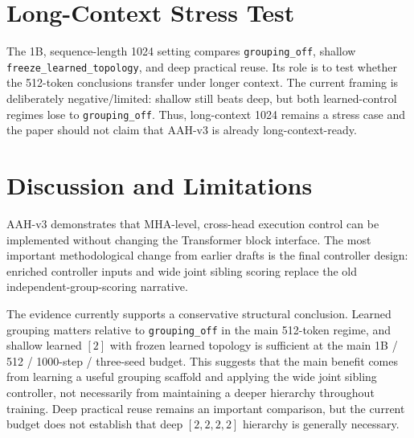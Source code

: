 \documentclass[11pt]{article}
\begin{document}
\section{Long-Context Stress Test}

The 1B, sequence-length 1024 setting compares \texttt{grouping\_off}, shallow \texttt{freeze\_learned\_topology}, and deep practical reuse. Its role is to test whether the 512-token conclusions transfer under longer context. The current framing is deliberately negative/limited: shallow still beats deep, but both learned-control regimes lose to \texttt{grouping\_off}. Thus, long-context 1024 remains a stress case and the paper should not claim that AAH-v3 is already long-context-ready.

\begin{table}[ht]
  \centering
  \caption{Secondary long-context stress-test structure. This table is a limitation-oriented comparison, not the primary claim table. Current framing: shallow beats deep, but both lose to \texttt{grouping\_off}.}
  \label{tab:long_context}
\end{table}

\section{Discussion and Limitations}

AAH-v3 demonstrates that MHA-level, cross-head execution control can be implemented without changing the Transformer block interface. The most important methodological change from earlier drafts is the final controller design: enriched controller inputs and wide joint sibling scoring replace the old independent-group-scoring narrative.

The evidence currently supports a conservative structural conclusion. Learned grouping matters relative to \texttt{grouping\_off} in the main 512-token regime, and shallow learned \([2]\) with frozen learned topology is sufficient at the main 1B / 512 / 1000-step / three-seed budget. This suggests that the main benefit comes from learning a useful grouping scaffold and applying the wide joint sibling controller, not necessarily from maintaining a deeper hierarchy throughout training. Deep practical reuse remains an important comparison, but the current budget does not establish that deep \([2,2,2,2]\) hierarchy is generally necessary.
\end{document}
